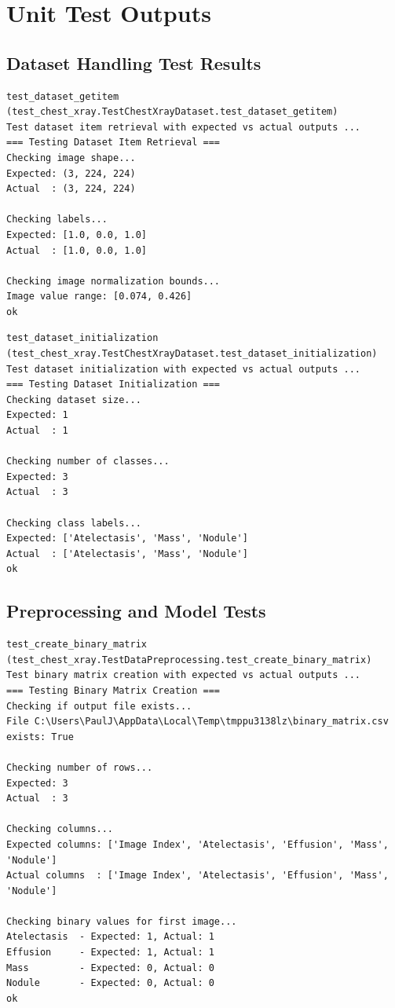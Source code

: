 \documentclass[12pt, titlepage]{article}
\begin{document}
\section{Unit Test Outputs}

\subsection{Dataset Handling Test Results}
\begin{verbatim}
test_dataset_getitem (test_chest_xray.TestChestXrayDataset.test_dataset_getitem)
Test dataset item retrieval with expected vs actual outputs ...
=== Testing Dataset Item Retrieval ===
Checking image shape...
Expected: (3, 224, 224)
Actual  : (3, 224, 224)

Checking labels...
Expected: [1.0, 0.0, 1.0]
Actual  : [1.0, 0.0, 1.0]

Checking image normalization bounds...
Image value range: [0.074, 0.426]
ok
\end{verbatim}

\begin{verbatim}
test_dataset_initialization (test_chest_xray.TestChestXrayDataset.test_dataset_initialization)
Test dataset initialization with expected vs actual outputs ...
=== Testing Dataset Initialization ===
Checking dataset size...
Expected: 1
Actual  : 1

Checking number of classes...
Expected: 3
Actual  : 3

Checking class labels...
Expected: ['Atelectasis', 'Mass', 'Nodule']
Actual  : ['Atelectasis', 'Mass', 'Nodule']
ok
\end{verbatim}

\subsection{Preprocessing and Model Tests}

\begin{verbatim}
test_create_binary_matrix (test_chest_xray.TestDataPreprocessing.test_create_binary_matrix)
Test binary matrix creation with expected vs actual outputs ...
=== Testing Binary Matrix Creation ===
Checking if output file exists...
File C:\Users\PaulJ\AppData\Local\Temp\tmppu3138lz\binary_matrix.csv exists: True

Checking number of rows...
Expected: 3
Actual  : 3

Checking columns...
Expected columns: ['Image Index', 'Atelectasis', 'Effusion', 'Mass', 'Nodule']
Actual columns  : ['Image Index', 'Atelectasis', 'Effusion', 'Mass', 'Nodule']

Checking binary values for first image...
Atelectasis  - Expected: 1, Actual: 1
Effusion     - Expected: 1, Actual: 1
Mass         - Expected: 0, Actual: 0
Nodule       - Expected: 0, Actual: 0
ok
\end{verbatim}
\end{document}
